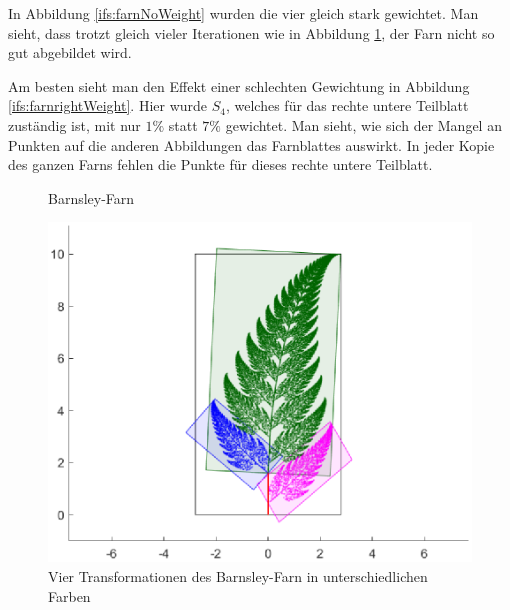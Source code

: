 In Abbildung \ref{ifs:farnNoWeight} wurden die vier gleich stark gewichtet.
Man sieht, dass trotzt gleich vieler Iterationen wie in Abbildung \ref{ifs:farn}, der Farn nicht so gut abgebildet wird.

Am besten sieht man den Effekt einer schlechten Gewichtung in Abbildung \ref{ifs:farnrightWeight}.
Hier wurde $S_4$, welches für das rechte untere Teilblatt zuständig ist, mit nur $1\%$ statt $7\%$ gewichtet.
Man sieht, wie sich der Mangel an Punkten auf die anderen Abbildungen das Farnblattes auswirkt.
In jeder Kopie des ganzen Farns fehlen die Punkte für dieses rechte untere Teilblatt.



\begin{figure}	
	\centering
	\caption{Barnsley-Farn}
	\label{ifs:farn}
\end{figure}
\begin{figure}
	\centering
	\includegraphics[width=\textwidth]{papers/ifs/images/farncolor2}
	\caption{Vier Transformationen des Barnsley-Farn in unterschiedlichen Farben}
	\label{ifs:farncolor}
\end{figure}

